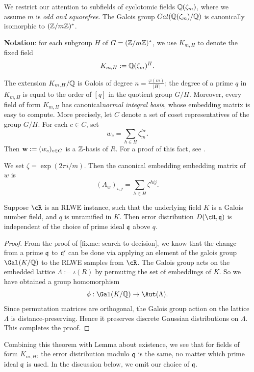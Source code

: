 \documentclass{amsart}
\begin{document}
We restrict our attention to subfields of cyclotomic fields $\mathbb{Q}(\zeta_m)$, where we assume $m$ is {\it odd and squarefree}. The Galois group $Gal(\mathbb{Q}(\zeta_m)/\mathbb{Q})$ is canonically isomorphic to $(\mathbb{Z}/m\mathbb{Z})^*$.

{\bf Notation}: for each subgroup $H$ of $G = (\mathbb{Z}/m\mathbb{Z})^*$, we use $K_{m,H}$ to denote the fixed field
\[
    K_{m,H} := \mathbb{Q}(\zeta_m)^H.
\]

The extension $K_{m,H}/\mathbb{Q}$ is Galois of degree $n = \frac{\varphi(m)}{|H|}$; the degree of a prime $q$ in $K_{m,H}$ is equal to the order of $[q]$ in the quotient group $G/H$. Moreover, every field of form $K_{m,H}$ has canonical{\it normal integral basis}, whose embedding matrix is easy to compute. More precisely, let $C$ denote a set of coset representatives of the group $G/H$. For each $c \in C$, set
\[
    w_c =  \sum_{h \in H} \zeta_m^{hc}.
\]
Then  ${\bf w} := (w_c)_{c \in C}$ is a $\mathbb{Z}$-basis of $R$. For a proof of this fact, see \cite[Proposition 6.1]{johnston2011notes}.

We set $\zeta = \exp(2\pi i /m)$. Then the canonical embedding embedding matrix of $w$ is
\[
    (A_w)_{i,j} = \sum_{h \in H}{\zeta^{hij}}.
\]

\begin{Prop}
Suppose $\cR$ is an RLWE instance, such that the underlying field $K$ is a Galois number field, and $q$ is unramified in $K$. Then error distribution $D(\cR, \fq)$ is independent of the choice of prime ideal $\mathfrak{q}$ above $q$.
\end{Prop}

\begin{proof}
From the proof of [fixme: search-to-decision], we know that the change from a prime $\mathfrak{q}$ to $\mathfrak{q}'$ can be done via applying an element of the galois group $\Gal(K/\bQ)$ to the RLWE samples from $\cR$. The Galois group acts on the embedded lattice $\Lambda := \iota(R)$ by permuting the set of embeddings of $K$. So we have obtained a group homomorphism $$\phi: \Gal(K/\bQ) \to \Aut(\Lambda).$$
Since permutation matrices are orthogonal, the Galois group action on the lattice $\Lambda$ is distance-preserving. Hence it preserves discrete Gaussian distributions on $\Lambda$. This completes the proof.
\end{proof}

Combining this theorem with Lemma about existence, we see that for fields of form $K_{m,H}$, the error distribution modulo $\mathfrak{q}$ is the same, no matter which prime ideal $\mathfrak{q}$ is used. In the discussion below, we omit our choice of $\mathfrak{q}$.
\end{document}
